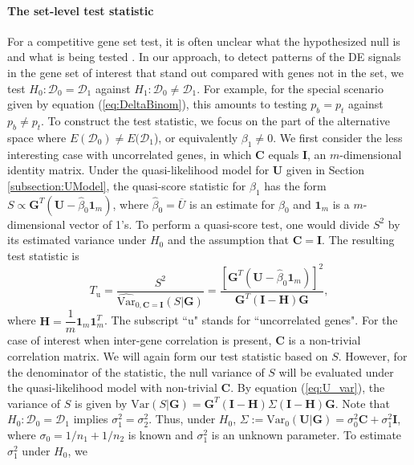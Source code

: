 	\paragraph{The set-level test statistic}\label{subsection:MEQL}
	For a competitive gene set test, it is often unclear what the hypothesized null is and what is
	being tested \citep{barry2008statistical,wu2012camera}. In our approach, to detect patterns of 
	the
	DE signals in the gene set of interest that stand out compared with genes not in the set, we 
	test
	$H_0: \mathscr{D}_0=\mathscr{D}_1$ against $H_1: \mathscr{D}_0\ne\mathscr{D}_1$. For example, 
	for
	the special scenario given by equation (\ref{eq:DeltaBinom}), this amounts to testing 
	$p_{b}=p_{t}$
	against $p_{b}\ne p_{t}$.
	To construct the test statistic, we focus on the part of the alternative space where
	$E(\mathscr{D}_0)\ne E(\mathscr{D}_1$), or equivalently $\beta_1\ne 0$. We first consider the 
	less
	interesting case with uncorrelated genes, in which $\bm C$ equals $\bm I$, an $m$-dimensional
	identity matrix. Under the quasi-likelihood model for $\bm U$ given in Section
	\ref{subsection:UModel},  the quasi-score statistic for $\beta_1$ has the form $S \propto \bm
	G^T(\bm U-\hat\beta_0\bm 1_m)$, where $\hat\beta_0=\overline{U}$ is an estimate for $\beta_0$ 
	and
	$\bm 1_m$ is a $m$-dimensional vector of 1's. To perform a quasi-score test, one would divide 
	$S^2$
	by its estimated variance under $H_0$ and the assumption that $\bm C=\bm I$. The resulting test
	statistic is 
	\begin{equation}
	T_{\text{u}} = \dfrac{S^2}{\widehat{\mbox{Var}}_{0, \bm C=\bm I}(S|\bm G)} = \dfrac{[\bm G^T(\bm
		U-\hat\beta_0\bm 1_m)]^2}{\bm G^T(\bm I-\bm H)\bm G}, 
	\end{equation}
	where $\bm H = \dfrac{1}{m}\bm 1_m\bm 1_m^T$. The subscript ``u" stands for ``uncorrelated 
	genes".
	For the case of interest when inter-gene correlation is present, $\bm C$ is a non-trivial
	correlation matrix. We will again form our test statistic based on $S$. However, for the
	denominator of the statistic, the null variance of $S$ will be evaluated under the 
	quasi-likelihood
	model with non-trivial $\bm C$. By equation (\ref{eq:U_var}), the variance of $S$ is given by
	$\mbox{Var}(S|\bm G) = \bm G^T(\bm I-\bm H)\Sigma(\bm I-\bm H)\bm G$. Note that $H_0:
	\mathscr{D}_0=\mathscr{D}_1$ implies $\sigma_1^2=\sigma_2^2$. Thus, under $H_0$,
	$\Sigma:=\mbox{Var}_{0}(\bm U|\bm G)=\sigma_0^2\bm C+\sigma_1^2\bm I$, where 
	$\sigma_0=1/n_1+1/n_2$
	is known and $\sigma_1^2$ is an unknown parameter. To estimate $\sigma_1^2$ under $H_0$, we 
